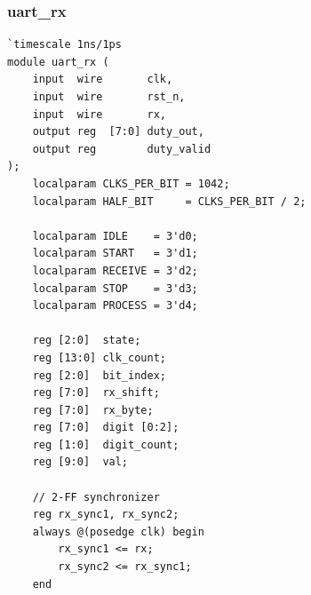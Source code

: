 \documentclass[12pt,a4paper]{article}
\begin{document}
\subsubsection*{uart\_rx}
\begin{lstlisting}
`timescale 1ns/1ps
module uart_rx (
    input  wire       clk,
    input  wire       rst_n,
    input  wire       rx,
    output reg  [7:0] duty_out,
    output reg        duty_valid
);
    localparam CLKS_PER_BIT = 1042;
    localparam HALF_BIT     = CLKS_PER_BIT / 2;

    localparam IDLE    = 3'd0;
    localparam START   = 3'd1;
    localparam RECEIVE = 3'd2;
    localparam STOP    = 3'd3;
    localparam PROCESS = 3'd4;

    reg [2:0]  state;
    reg [13:0] clk_count;
    reg [2:0]  bit_index;
    reg [7:0]  rx_shift;
    reg [7:0]  rx_byte;
    reg [7:0]  digit [0:2];
    reg [1:0]  digit_count;
    reg [9:0]  val;

    // 2-FF synchronizer
    reg rx_sync1, rx_sync2;
    always @(posedge clk) begin
        rx_sync1 <= rx;
        rx_sync2 <= rx_sync1;
    end


\end{lstlisting}
\end{document}
